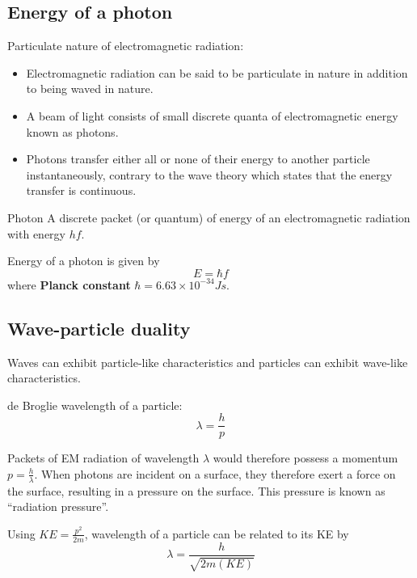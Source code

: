 \subsection{Energy of a photon}
Particulate nature of electromagnetic radiation:
\begin{itemize}
\item Electromagnetic radiation can be said to be particulate in nature in addition to being waved in nature.
\item A beam of light consists of small discrete quanta of electromagnetic energy known as photons.
\item Photons transfer either all or none of their energy to another particle instantaneously, contrary to the wave theory which states that the energy transfer is continuous.
\end{itemize}

\begin{defn}{Photon}{}
A discrete packet (or quantum) of energy of an electromagnetic radiation with energy $hf$.
\end{defn}

Energy of a photon is given by
\begin{equation}
E = \hbar f
\end{equation}
where \textbf{Planck constant} $\hbar = 6.63 \times 10^{-34}\unit{J}\unit{s}$.



\subsection{Wave-particle duality}
Waves can exhibit particle-like characteristics and particles can exhibit wave-like characteristics.

de Broglie wavelength of a particle: 
\begin{equation}
\lambda = \frac{h}{p}
\end{equation}

Packets of EM radiation of wavelength $\lambda$ would therefore possess a momentum $p=\frac{h}{\lambda}$. When photons are incident on a surface, they therefore exert a force on the surface, resulting in a pressure on the surface. This pressure is known as “radiation pressure”. 

Using $KE=\frac{p^2}{2m}$,  wavelength of a particle
can be related to its KE by
\begin{equation}
\lambda = \frac{h}{\sqrt{2m(KE)}}
\end{equation}

